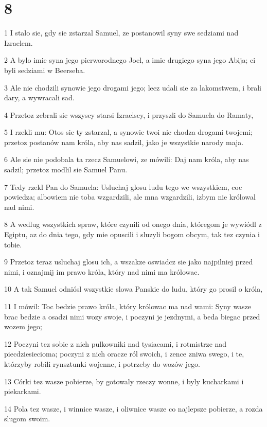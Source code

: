 \chapter{8}

\par 1 I stalo sie, gdy sie zstarzal Samuel, ze postanowil syny swe sedziami nad Izraelem.
\par 2 A bylo imie syna jego pierworodnego Joel, a imie drugiego syna jego Abija; ci byli sedziami w Beerseba.
\par 3 Ale nie chodzili synowie jego drogami jego; lecz udali sie za lakomstwem, i brali dary, a wywracali sad.
\par 4 Przetoz zebrali sie wszyscy starsi Izraelscy, i przyszli do Samuela do Ramaty,
\par 5 I rzekli mu: Otos sie ty zstarzal, a synowie twoi nie chodza drogami twojemi; przetoz postanów nam króla, aby nas sadzil, jako je wszystkie narody maja.
\par 6 Ale sie nie podobala ta rzecz Samuelowi, ze mówili: Daj nam króla, aby nas sadzil; przetoz modlil sie Samuel Panu.
\par 7 Tedy rzekl Pan do Samuela: Usluchaj glosu ludu tego we wszystkiem, coc powiedza; albowiem nie toba wzgardzili, ale mna wzgardzili, izbym nie królowal nad nimi.
\par 8 A wedlug wszystkich spraw, które czynili od onego dnia, któregom je wywiódl z Egiptu, az do dnia tego, gdy mie opuscili i sluzyli bogom obcym, tak tez czynia i tobie.
\par 9 Przetoz teraz usluchaj glosu ich, a wszakze oswiadcz sie jako najpilniej przed nimi, i oznajmij im prawo króla, który nad nimi ma królowac.
\par 10 A tak Samuel odniósl wszystkie slowa Panskie do ludu, który go prosil o króla,
\par 11 I mówil: Toc bedzie prawo króla, który królowac ma nad wami: Syny wasze brac bedzie a osadzi nimi wozy swoje, i poczyni je jezdnymi, a beda biegac przed wozem jego;
\par 12 Poczyni tez sobie z nich pulkowniki nad tysiacami, i rotmistrze nad piecdziesiecioma; poczyni z nich oracze ról swoich, i zence zniwa swego, i te, którzyby robili rynsztunki wojenne, i potrzeby do wozów jego.
\par 13 Córki tez wasze pobierze, by gotowaly rzeczy wonne, i byly kucharkami i piekarkami.
\par 14 Pola tez wasze, i winnice wasze, i oliwnice wasze co najlepsze pobierze, a rozda slugom swoim.
